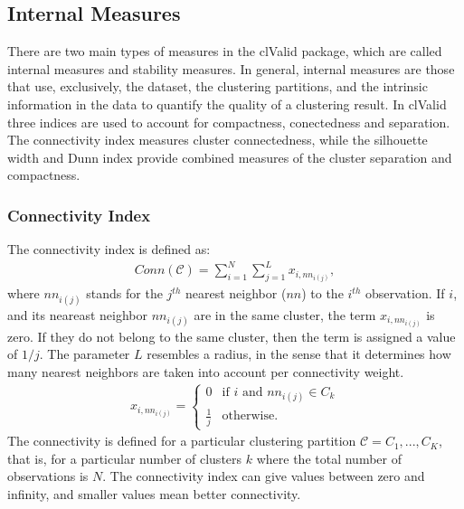 \subsection{Internal Measures}
There are two main types of measures in the clValid package, which are
called internal measures and  stability measures. In general, internal
measures are those that  use, exclusively, the dataset, the clustering
partitions, and the intrinsic information  in the data to quantify the
quality of a  clustering result. In clValid three  indices are used to
account for compactness, conectedness and separation. The connectivity
index measures  cluster connectedness, while the  silhouette width and
Dunn  index provide combined  measures of  the cluster  separation and
compactness.

\subsubsection{Connectivity Index}
The connectivity index is defined as:
\begin{gather}
Conn(\mathcal{C}) = \sum_{i=1}^{N}\sum_{j=1}^{L} x_{i,nn_{i(j)}},
\end{gather}
where   $nn_{i(j)}$   stands  for   the   $j^{th}$  nearest   neighbor
($nn$) to  the $i^{th}$ observation.  If $i$,  and its neareast
neighbor   $nn_{i(j)}$   are   in   the   same   cluster,   the   term
$x_{i,nn_{i(j)}}$ is zero. If they  do not belong to the same cluster,
then  the  term is  assigned  a value  of  $1/j$.   The parameter  $L$
resembles a radius,  in the sense that it  determines how many nearest
neighbors are taken into account per connectivity weight.
\begin{gather}
x_{i,nn_{i(j)}} =
    \begin{cases}
      0           &  \text{if } i \text{ and } nn_{i(j)} \in C_{k} \\
      \frac{1}{j} &  \text{otherwise.}
    \end{cases}
\end{gather}  
The  connectivity is  defined  for a  particular clustering  partition
$\mathcal{C} =  {C_{1},..., C_{K}}$, that is, for  a particular number
of clusters $k$ where the total number of observations is $N$. 
The connectivity index can give values between zero and infinity,
and smaller values mean better connectivity.

